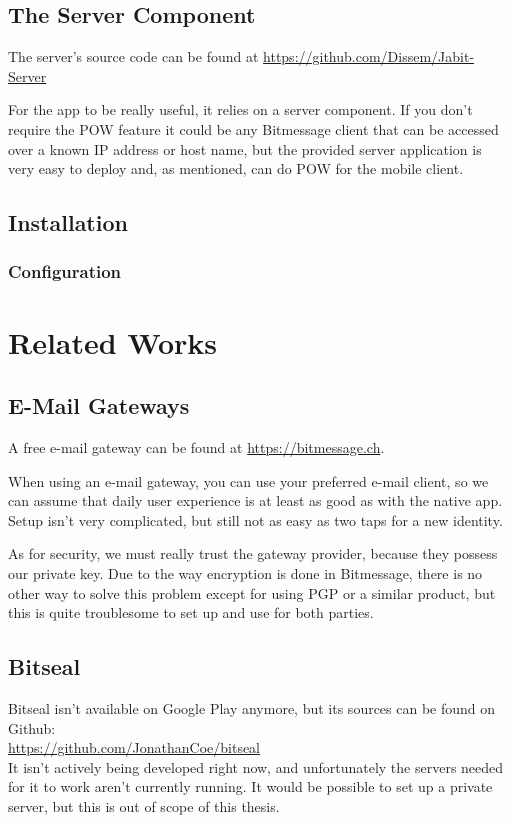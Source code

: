 \documentclass{bfh}
\begin{document}
  \subsection{The Server Component}
  The server's source code can be found at \url{https://github.com/Dissem/Jabit-Server}

  For the app to be really useful, it relies on a server component. If you don't require the \ac{POW} feature it could be any Bitmessage client that can be accessed over a known \acs{IP} address or host name, but the provided server application is very easy to deploy and, as mentioned, can do \ac{POW} for the mobile client.

  \subsection{Installation}


  \subsubsection{Configuration}


  \newpage
  \section{Related Works}
  \subsection{E-Mail Gateways}
  A free e-mail gateway can be found at \url{https://bitmessage.ch}.

  When using an e-mail gateway, you can use your preferred e-mail client, so we can assume that daily user experience is at least as good as with the native app. Setup isn't very complicated, but still not as easy as two taps for a new identity.

  As for security, we must really trust the gateway provider, because they possess our private key. Due to the way encryption is done in Bitmessage, there is no other way to solve this problem except for using \ac{PGP} or a similar product, but this is quite troublesome to set up and use for both parties.


  \subsection{Bitseal}
  Bitseal isn't available on Google Play anymore, but its sources can be found on Github:\\
  \url{https://github.com/JonathanCoe/bitseal}\\
  It isn't actively being developed right now, and unfortunately the servers needed for it to work aren't currently running. It would be possible to set up a private server, but this is out of scope of this thesis.
\end{document}
